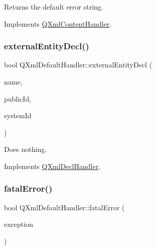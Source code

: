 Returns the default error string. 

Implements \mbox{\hyperlink{class_q_xml_content_handler_adba96547bad1cf1b009dbfb7b7c571be}{Q\+Xml\+Content\+Handler}}.

\mbox{\label{class_q_xml_default_handler_ac66a6f6bd7275b4515c21c6542a84138}} 
\subsubsection{\texorpdfstring{externalEntityDecl()}{externalEntityDecl()}}
{\footnotesize\ttfamily bool Q\+Xml\+Default\+Handler\+::external\+Entity\+Decl (\begin{DoxyParamCaption}\item[{const \mbox{\hyperlink{class_q_string}{Q\+String}} \&}]{name,  }\item[{const \mbox{\hyperlink{class_q_string}{Q\+String}} \&}]{public\+Id,  }\item[{const \mbox{\hyperlink{class_q_string}{Q\+String}} \&}]{system\+Id }\end{DoxyParamCaption})\hspace{0.3cm}{\ttfamily [virtual]}}

Does nothing. 

Implements \mbox{\hyperlink{class_q_xml_decl_handler_ae12d792c249eb6f92c54b2e1734fd60f}{Q\+Xml\+Decl\+Handler}}.

\mbox{\label{class_q_xml_default_handler_a365448a99398f6939706d6e63e6b215d}} 
\subsubsection{\texorpdfstring{fatalError()}{fatalError()}}
{\footnotesize\ttfamily bool Q\+Xml\+Default\+Handler\+::fatal\+Error (\begin{DoxyParamCaption}\item[{const \mbox{\hyperlink{class_q_xml_parse_exception}{Q\+Xml\+Parse\+Exception}} \&}]{exception }\end{DoxyParamCaption})\hspace{0.3cm}{\ttfamily [virtual]}}

